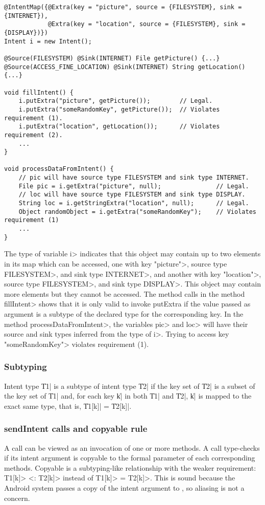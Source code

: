\begin{Verbatim}
@IntentMap({@Extra(key = "picture", source = {FILESYSTEM}, sink = {INTERNET}),
            @Extra(key = "location", source = {FILESYSTEM}, sink = {DISPLAY})}) 
Intent i = new Intent();

@Source(FILESYSTEM) @Sink(INTERNET) File getPicture() {...}
@Source(ACCESS_FINE_LOCATION) @Sink(INTERNET) String getLocation() {...}

void fillIntent() {
    i.putExtra("picture", getPicture());        // Legal.
    i.putExtra("someRandomKey", getPicture());  // Violates requirement (1).
    i.putExtra("location", getLocation());      // Violates requirement (2).
    ...
}

void processDataFromIntent() {
    // pic will have source type FILESYSTEM and sink type INTERNET.
    File pic = i.getExtra("picture", null);               // Legal.
    // loc will have source type FILESYSTEM and sink type DISPLAY.
    String loc = i.getStringExtra("location", null);      // Legal.
    Object randomObject = i.getExtra("someRandomKey");    // Violates requirement (1)
    ...
}
\end{Verbatim}

\noindent
The type of variable \<i> indicates that this object may contain up to two
elements in its map which can be accessed, one with key \<"picture">,
source type \<FILESYSTEM>, and sink type
\<INTERNET>, and another with key \<"location">, source type \<FILESYSTEM>, and sink
type \<DISPLAY>. This object may contain more elements but they cannot be
accessed. The method calls in the method \<fillIntent> shows that it is only
valid to invoke putExtra if the value passed as argument is a subtype of the
declared type for the corresponding key. In the method \<processDataFromIntent>,
the variables \<pic> and \<loc> will have their source and sink types
inferred from the type of \<i>. Trying to access key \<"someRandomKey"> violates
requirement (1).


\subsubsection{Subtyping}
Intent type \|T1| is a subtype of intent type \|T2| if the key set of 
\|T2| is a subset of the key set of \|T1| and, for each key \|k| in both 
\|T1| and \|T2|, \|k| is mapped to the exact same type, that is, 
\|T1[k]| = \|T2[k]|.

\subsubsection{sendIntent calls and copyable rule}
A \sendIntent{} call can be viewed as an invocation of one or more \onReceive{} methods.
A \sendIntent{} call type-checks if its intent argument is
copyable to the formal parameter of each corresponding \onReceive{} methods.
Copyable is a subtyping-like relationship with the weaker requirement: 
\<T1[k]> <: \<T2[k]> instead of \<T1[k]> = \<T2[k]>.
This is sound because the Android system passes a copy of the intent argument to
\onReceive{}, so aliasing is not a concern.

